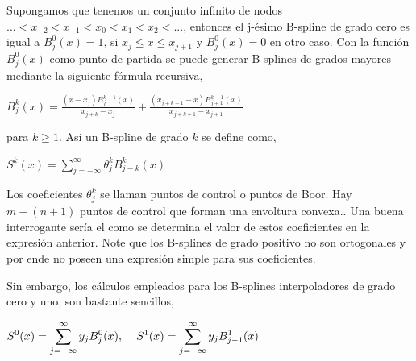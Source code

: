 \hspace{0.4cm} Supongamos que tenemos un conjunto infinito de nodos $...<x_{-2}<x_{-1}<x_{0}<x_{1}<x_{2}<...$, entonces el j-\'esimo B-spline de grado cero es igual a $B^{0}_{j}(x)=1$, si $x_{j} \leq x \leq x_{j+1}$ y $B^{0}_{j}(x)=0$ en otro caso. Con la funci\'on $B^{0}_{j}(x)$ como punto de partida se puede generar B-splines de grados mayores mediante la siguiente f\'ormula recursiva,\\

\begin{center}

$\displaystyle{B^{k}_{j}(x) = \frac{(x-x_{j})B^{k-1}_{j}(x)}{x_{j+k}-x_{j}} + \frac{(x_{j+k+1}-x)B^{k-1}_{j+1}(x)}{x_{j+k+1}-x_{j+1}}}$
\end{center}

\vspace{0.5cm}

\noindent para $k\geq 1$. As\'i un B-spline de grado $k$ se define como,\\

\begin{center}

$\displaystyle{S^{k}(x) = \sum_{j=-\infty}^{\infty} \theta^{k}_{j} B^{k}_{j-k}(x)}$
\end{center}

\vspace{0.5cm}

\hspace{0.4cm} Los coeficientes $\theta^{k}_{j}$ se llaman puntos de control o puntos de Boor. Hay $m-(n+1)$ puntos de control que forman una envoltura convexa.. Una buena interrogante ser\'ia el como se determina el valor de estos coeficientes en la expresi\'on anterior. Note que los B-splines de grado positivo no son ortogonales y por ende no poseen una expresi\'on simple para sus coeficientes.


Sin embargo, los c\'alculos empleados para los B-splines interpoladores de grado cero y uno, son bastante sencillos,\\

\begin{center}

$\displaystyle{S^{0}(x) = \sum_{j=-\infty}^{\infty} y_{j} B^{0}_{j}(x),\hspace{0.4cm} S^{1}(x) = \sum_{j=-\infty}^{\infty} y_{j} B^{1}_{j-1}(x) }$
\end{center}

\vspace{0.5cm}


